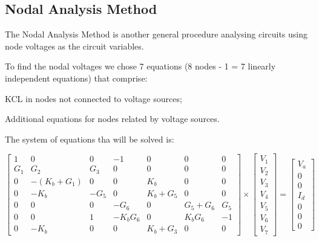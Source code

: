 \subsection{Nodal Analysis Method}

\hspace{0,5cm} The Nodal Analysis Method is another general procedure analysing circuits using node voltages as the circuit variables. 

To find the nodal voltages we chose 7 equations (8 nodes - 1 = 7 linearly independent equations) that comprise:

\hspace{1cm} KCL in nodes not connected to voltage sources;

\hspace{1cm} Additional equations for nodes related by voltage sources.

The system of equations tha will be solved is:

\begin{equation}
\begin{bmatrix} 
1 & 0 & 0 & -1 & 0 & 0 & 0  \\ 
G_1 & G_2 & G_3 & 0 & 0 & 0 & 0  \\
0 & -(K_b + G_1) & 0 & 0 & K_b & 0 & 0 \\ 
0 & -K_b & -G_5 & 0 & K_b + G_5 & 0 & 0 \\
0 & 0 & 0 & -G_6 & 0 & G_5 + G_6 & G_5 \\ 
0 & 0 & 1 & -K_b G_6 & 0 & K_b G_6 & -1 \\
0 & -K_b & 0 & 0 & K_b + G_3 & 0 & 0 
\end{bmatrix} 
\times
\begin{bmatrix} 
V_1 \\ 
V_2 \\ 
V_3 \\ 
V_4 \\ 
V_5 \\ 
V_6 \\ 
V_7
\end{bmatrix} =
\begin{bmatrix} 
V_a \\ 
0 \\ 
0 \\ 
I_d \\ 
0 \\ 
0 \\ 
0
\end{bmatrix}
\end{equation}

\lipsum[1-1]


